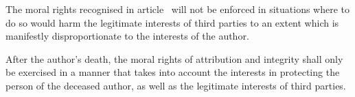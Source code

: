 \begin{contract}
\label{Par:InterestsOfThirdParties}
\Sentence  The moral rights recognised in article~ will not be enforced in situations 
where to do so would harm the legitimate interests of third parties to
an extent which is manifestly disproportionate to the interests of the
author.

\Sentence  After the author's death, the moral rights of attribution and integrity
shall only be exercised in a manner that takes into account the interests
in protecting the person of the deceased author, as well as the legitimate
interests of third parties.

\end{contract}